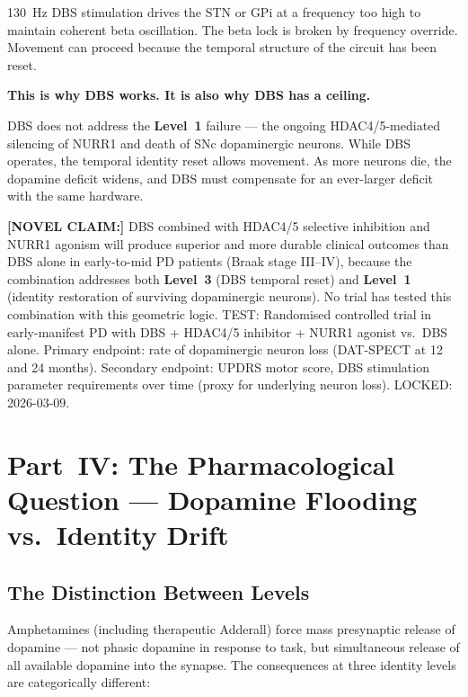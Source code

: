 \documentclass[12pt,a4paper]{article}
\newcommand{\novel}[1]{\noindent\colorbox{yellow!18}{\parbox{\dimexpr\linewidth-2\fboxsep}{%
  \textbf{[NOVEL CLAIM:]} #1}}\vspace{0.4em}}
\newcommand{\Lev}[1]{\textbf{Level~#1}}
\begin{document}
130~Hz DBS stimulation drives the STN or GPi at a frequency too high to
maintain coherent beta oscillation. The beta lock is broken by frequency
override. Movement can proceed because the temporal structure of the circuit
has been reset.

\textbf{This is why DBS works. It is also why DBS has a ceiling.}

DBS does not address the \Lev{1} failure --- the ongoing HDAC4/5-mediated
silencing of NURR1 and death of SNc dopaminergic neurons. While DBS
operates, the temporal identity reset allows movement. As more neurons die,
the dopamine deficit widens, and DBS must compensate for an ever-larger
deficit with the same hardware.

\novel{DBS combined with HDAC4/5 selective inhibition and NURR1 agonism
will produce superior and more durable clinical outcomes than DBS alone
in early-to-mid PD patients (Braak stage III--IV), because the combination
addresses both \Lev{3} (DBS temporal reset) and \Lev{1} (identity restoration
of surviving dopaminergic neurons). No trial has tested this combination with
this geometric logic. TEST: Randomised controlled trial in early-manifest PD
with DBS + HDAC4/5 inhibitor + NURR1 agonist vs.\ DBS alone. Primary
endpoint: rate of dopaminergic neuron loss (DAT-SPECT at 12 and 24 months).
Secondary endpoint: UPDRS motor score, DBS stimulation parameter
requirements over time (proxy for underlying neuron loss). LOCKED:
2026-03-09.}

\section{Part~IV: The Pharmacological Question ---
Dopamine Flooding vs.\ Identity Drift}

\subsection{The Distinction Between Levels}

Amphetamines (including therapeutic Adderall) force mass presynaptic
release of dopamine --- not phasic dopamine in response to task, but
simultaneous release of all available dopamine into the synapse. The
consequences at three identity levels are categorically different:
\end{document}
